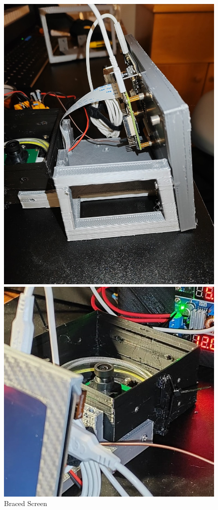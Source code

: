 \begin{figure}[t]
\begin{minipage}[t]{0.24\textwidth}
    \includegraphics[width=\textwidth]{imgs/design/bracedscreen.jpeg}
    \caption{Braced Screen}
    \label{fig:bracedscreen}
  \end{minipage}
  \hfill
  \begin{minipage}[t]{0.24\textwidth}
    \centering
    \includegraphics[width=\textwidth]{imgs/design/shortcamera.jpeg}

\end{minipage}
\end{figure}
